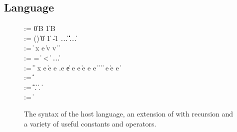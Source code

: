 \subsection{\Implang{} Language}
\label{sec:host-lang}
\begin{figure}[tp]
\begin{bnf}
       \::= \cdot \| 0\,B \| 1\,B \\ 
    \::=
      () \| \itrue \| \ifalse \| 0 \| 1 \| -1 \| \dots \nlalt
      \ierr \| \data \| \off \| \iok \| \iecerr \| \iecpc \| \ldots \\

    \::= 
      \const \| %
       {\nrm x} e \| \ipair v v \nlalt
       \|  \|
       \\

    \::= 
      = \; \| \; < \; \| \inotop %
      \| \ldots \\

    \::= 
      \const \| \var \|  \|
       {\nrm x} e \| 
      \iapp e e \nlalt
    \Lambda \alpha.e \| e \; [\ty] \nlalt
       e \; e \|
      \iif e \; \ithen e \; \ielse e \nlalt
       \|  \|
       \|  \nlalt
       \nlalt
       \|  {\nrm e} \| \isub e {\nrm e} \nlalt
       \| 
      \\
      
    \::= 
      \iunitty \| \iboolty \| \iintty  \| 
      \invty \nlalt  \ibitsty \| \ioffty \| \iecty
  \\
   \meta{\ity} \::= 
      \ibasety \| \ityvar \| \iarrow \ity \ity \| \iprod \ity \ity \|
      \isum \ity \ity \nlalt
      \iseq \ity \| \forall \ityvar.\ity  \|
      \imu \ityvar \ity   
      \| \lambda \alpha.\ity 
      \| \ity \; \ity
  \\
   \meta{\kappa} \::= \kty \| \kappa \rightarrow \kappa
\end{bnf}
\caption{The syntax of the host language, an extension of \fomega{}
  with recursion and a variety of useful constants and operators.}
\label{fig:implang-syntax}
\end{figure}

